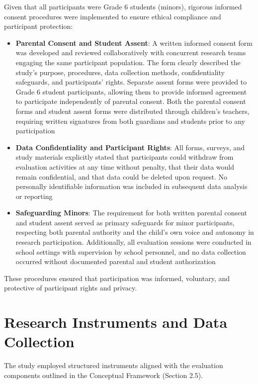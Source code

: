 Given that all participants were Grade 6 students (minors), rigorous informed consent procedures were implemented to ensure ethical compliance and participant protection:

\begin{itemize}
    \item \textbf{Parental Consent and Student Assent}: A written informed consent form was developed and reviewed collaboratively with concurrent research teams engaging the same participant population. The form clearly described the study's purpose, procedures, data collection methods, confidentiality safeguards, and participants' rights. Separate assent forms were provided to Grade 6 student participants, allowing them to provide informed agreement to participate independently of parental consent. Both the parental consent forms and student assent forms were distributed through children's teachers, requiring written signatures from both guardians and students prior to any participation
    
    \item \textbf{Data Confidentiality and Participant Rights}: All forms, surveys, and study materials explicitly stated that participants could withdraw from evaluation activities at any time without penalty, that their data would remain confidential, and that data could be deleted upon request. No personally identifiable information was included in subsequent data analysis or reporting
    
    \item \textbf{Safeguarding Minors}: The requirement for both written parental consent and student assent served as primary safeguards for minor participants, respecting both parental authority and the child's own voice and autonomy in research participation. Additionally, all evaluation sessions were conducted in school settings with supervision by school personnel, and no data collection occurred without documented parental and student authorization
\end{itemize}

These procedures ensured that participation was informed, voluntary, and protective of participant rights and privacy.

\section{Research Instruments and Data Collection}

The study employed structured instruments aligned with the evaluation components outlined in the Conceptual Framework (Section 2.5).

